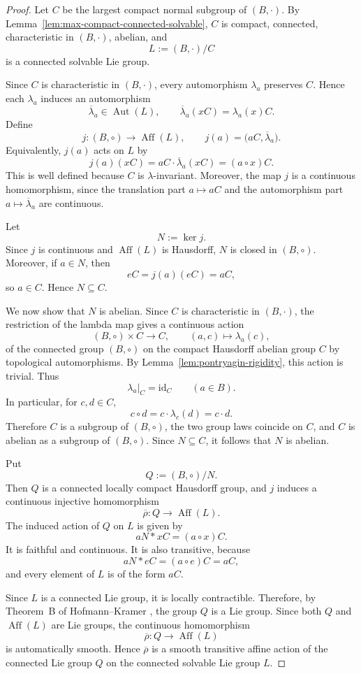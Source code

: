 \documentclass[reqno]{amsart}
\numberwithin{equation}{section}
\theoremstyle{definition}
\theoremstyle{remark}
\DeclareMathOperator{\Aut}{Aut}
\DeclareMathOperator{\Aff}{Aff}
\newcommand{\id}{\mathrm{id}}
\begin{document}
\begin{proof}
Let \(C\) be the largest compact normal subgroup of \((B,\cdot)\).
By Lemma~\ref{lem:max-compact-connected-solvable}, \(C\) is compact,
connected, characteristic in \((B,\cdot)\), abelian, and
\[
L:=(B,\cdot)/C
\]
is a connected solvable Lie group.

Since \(C\) is characteristic in \((B,\cdot)\), every automorphism
\(\lambda_a\) preserves \(C\). Hence each \(\lambda_a\) induces an automorphism
\[
\overline{\lambda}_a\in \Aut(L),
\qquad
\overline{\lambda}_a(xC)=\lambda_a(x)C.
\]
Define
\[
j\colon (B,\circ)\longrightarrow \Aff(L),
\qquad
j(a)=\bigl(aC,\overline{\lambda}_a\bigr).
\]
Equivalently, \(j(a)\) acts on \(L\) by
\[
j(a)(xC)=aC\cdot \overline{\lambda}_a(xC)=(a\circ x)C.
\]
This is well defined because \(C\) is \(\lambda\)-invariant. Moreover, the map
\(j\) is a continuous homomorphism, since the translation part
\(a\mapsto aC\) and the automorphism part \(a\mapsto\overline{\lambda}_a\) are
continuous.

Let
\[
N:=\ker j.
\]
Since \(j\) is continuous and \(\Aff(L)\) is Hausdorff, \(N\) is closed in
\((B,\circ)\). Moreover, if \(a\in N\), then
\[
eC=j(a)(eC)=aC,
\]
so \(a\in C\). Hence \(N\subseteq C\).

We now show that \(N\) is abelian. Since \(C\) is characteristic in
\((B,\cdot)\), the restriction of the lambda map gives a continuous action
\[
(B,\circ)\times C\longrightarrow C,
\qquad
(a,c)\longmapsto \lambda_a(c),
\]
of the connected group \((B,\circ)\) on the compact Hausdorff abelian group
\(C\) by topological automorphisms. By Lemma~\ref{lem:pontryagin-rigidity},
this action is trivial. Thus
\[
\lambda_a|_C=\id_C
\qquad (a\in B).
\]
In particular, for \(c,d\in C\),
\[
c\circ d=c\cdot \lambda_c(d)=c\cdot d.
\]
Therefore \(C\) is a subgroup of \((B,\circ)\), the two group laws coincide on
\(C\), and \(C\) is abelian as a subgroup of \((B,\circ)\). Since
\(N\subseteq C\), it follows that \(N\) is abelian.

Put
\[
Q:=(B,\circ)/N.
\]
Then \(Q\) is a connected locally compact Hausdorff group, and \(j\) induces a
continuous injective homomorphism
\[
\overline{\rho}\colon Q\longrightarrow \Aff(L).
\]
The induced action of \(Q\) on \(L\) is given by
\[
aN\ast xC=(a\circ x)C.
\]
It is faithful and continuous. It is also transitive, because
\[
aN\ast eC=(a\circ e)C=aC,
\]
and every element of \(L\) is of the form \(aC\).

Since \(L\) is a connected Lie group, it is locally contractible. Therefore, by
Theorem~B of Hofmann--Kramer \cite{HofmannKramer}, the group \(Q\) is a Lie
group. Since both \(Q\) and \(\Aff(L)\) are Lie groups, the continuous
homomorphism
\[
\overline{\rho}\colon Q\longrightarrow \Aff(L)
\]
is automatically smooth. Hence \(\overline{\rho}\) is a smooth transitive
affine action of the connected Lie group \(Q\) on the connected solvable Lie
group \(L\).


\end{proof}
\end{document}
